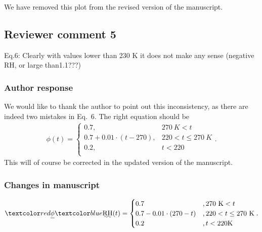 We have removed this plot from the revised version of the manuscript.

\subsection*{Reviewer comment 5}
Eq.6: Clearly with values lower than 230 K it does not make any sense (negative RH, or large than1.1???)

\subsubsection*{Author response}

We would like to thank the author to point out this inconsistency, as there are indeed two mistakes
in Eq.~6. The right equation should be
\begin{align}
\phi(t) = \begin{cases}
 0.7, & 270\ \unit{K} < t \\
 0.7 + 0.01 \cdot (t - 270), &220 < t \leq  270\ \unit{K} \\
 0.2,  & t < 220 \\
 \end{cases}.
\end{align}
This will of course be corrected in the updated version of the manuscript.

\subsubsection*{Changes in manuscript}

\begin{change}[202]
\begin{align}
\DIFdelbegin \DIFdel{\phi}\DIFdelend \DIFaddbegin \DIFadd{\text{RH}}\DIFaddend (t) = \DIFdelbegin %
\DIFdelend \DIFaddbegin \begin{cases}
 0.7 &, 270\ \unit{K} < t \\
 0.7 - 0.01 \cdot (270 -t) & ,220 < t \leq  270\ \unit{K} \\
 0.2 &,t < 220 \unit{K} \\
 \end{cases}\DIFaddend .
\end{align}
\end{change}

